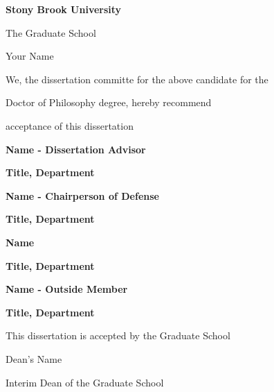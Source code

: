 
\centerline{\textbf{Stony Brook University}}
\vspace*{1\baselineskip}
\centerline{The Graduate School}
\vspace*{2\baselineskip}
\centerline{Your Name}
\vspace*{2\baselineskip}
\centerline{We, the dissertation committe for the above candidate for the}
\vspace*{1\baselineskip}
\centerline{Doctor of Philosophy degree, hereby recommend}
\vspace*{1\baselineskip}
\centerline{acceptance of this dissertation}
\vspace*{2\baselineskip}
\centerline{\textbf{Name - Dissertation Advisor}}
\centerline{\textbf{Title, Department}}
\vspace*{2\baselineskip}
\centerline{\textbf{Name - Chairperson of Defense}}
\centerline{\textbf{Title, Department}}
\vspace*{2\baselineskip}
\centerline{\textbf{Name}}
\centerline{\textbf{Title, Department}}
\vspace*{2\baselineskip}
\centerline{\textbf{Name - Outside Member}}
\centerline{\textbf{Title, Department}}
\vspace*{2\baselineskip}
\centerline{This dissertation is accepted by the Graduate School}
\vspace*{3\baselineskip}
\centerline{Dean's Name}
\centerline{Interim Dean of the Graduate School}
